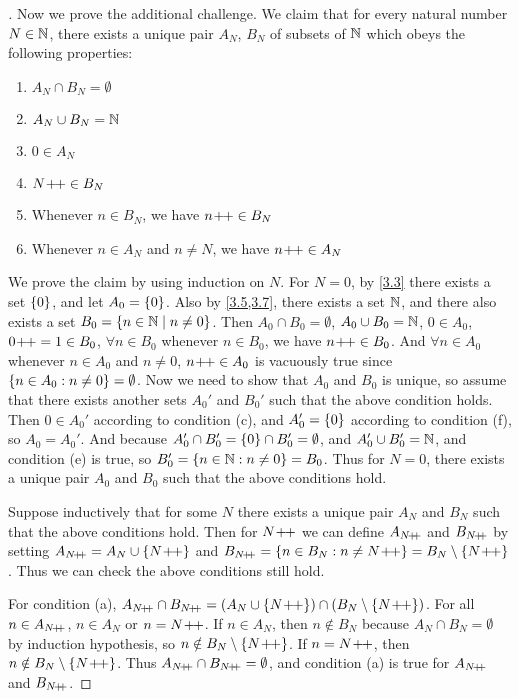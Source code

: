 \begin{proof}[]
	Now we prove the additional challenge.
	We claim that for every natural number \(N \in \mathbb{N}\), there exists a unique pair \(A_N\), \(B_N\) of subsets of \(\mathbb{N}\) which obeys the following properties:
	\begin{enumerate}
		\item \(A_N \cap B_N = \emptyset\)
		\item \(A_N \cup B_N = \mathbb{N}\)
		\item \(0 \in A_N\)
		\item \(N\!+\!\!+ \in B_N\)
		\item Whenever \(n \in B_N\), we have \(n\!+\!\!+ \in B_N\)
		\item Whenever \(n \in A_N\) and \(n \neq N\), we have \(n\!+\!\!+ \in A_N\)
	\end{enumerate}

	We prove the claim by using induction on \(N\).
	For \(N = 0\), by \cref{3.3} there exists a set \(\left\lbrace0\right\rbrace\), and let \(A_0 = \left\lbrace0\right\rbrace\).
	Also by \cref{3.5,3.7}, there exists a set \(\mathbb{N}\), and there also exists a set \(B_0 = \left\lbrace n \in \mathbb{N} \mid n \neq 0\right\rbrace\).
	Then \(A_0 \cap B_0 = \emptyset\), \(A_0 \cup B_0 = \mathbb{N}\), \(0 \in A_0\), \(0\!+\!\!+ = 1 \in B_0\), \(\forall n \in B_0\) whenever \(n \in B_0\), we have \(n\!+\!\!+ \in B_0\).
	And \(\forall n \in A_0\) whenever \(n \in A_0\) and \(n \neq 0\), \(n\!+\!\!+ \in A_0\) is vacuously true since \(\left\lbrace n \in A_0 : n \neq 0\right\rbrace = \emptyset\).
	Now we need to show that \(A_0\) and \(B_0\) is unique, so assume that there exists another sets \(A_0'\) and \(B_0'\) such that the above condition holds.
	Then \(0 \in A_0'\) according to condition (c), and \(A_0' = \left\lbrace0\right\rbrace\) according to condition (f), so \(A_0 = A_0'\).
	And because \(A_0' \cap B_0' = \left\lbrace0\right\rbrace \cap B_0' = \emptyset\), and \(A_0' \cup B_0' = \mathbb{N}\), and condition (e) is true, so \(B_0' = \left\lbrace n \in \mathbb{N} : n \neq 0\right\rbrace = B_0\).
	Thus for \(N = 0\), there exists a unique pair \(A_0\) and \(B_0\) such that the above conditions hold.

	Suppose inductively that for some \(N\) there exists a unique pair \(A_N\) and \(B_N\) such that the above conditions hold.
	Then for \(N\!+\!\!+\) we can define \(A_{N\!+\!\!+}\) and \(B_{N\!+\!\!+}\) by setting \(A_{N\!+\!\!+} = A_N \cup \left\lbrace N\!+\!\!+\right\rbrace\) and \(B_{N\pp} = \set{n \in B_N : n \neq N\pp} = B_N \setminus \set{N\pp}\).
	Thus we can check the above conditions still hold.

	For condition (a), \(A_{N\pp} \cap B_{N\pp} = (A_N \cup \set{N\pp}) \cap (B_N \setminus \set{N\pp})\).
	For all \(n \in A_{N\!+\!\!+}\), \(n \in A_N\) or \(n = N\!+\!\!+\).
	If \(n \in A_N\), then \(n \notin B_N\) because \(A_N \cap B_N = \emptyset\) by induction hypothesis, so \(n \notin B_N \setminus \left\lbrace N\!+\!\!+\right\rbrace\).
	If \(n = N\!+\!\!+\), then \(n \notin B_N \setminus \left\lbrace N\!+\!\!+\right\rbrace\).
	Thus \(A_{N\!+\!\!+} \cap B_{N\!+\!\!+} = \emptyset\), and condition (a) is true for \(A_{N\!+\!\!+}\) and \(B_{N\!+\!\!+}\).


\end{proof}
